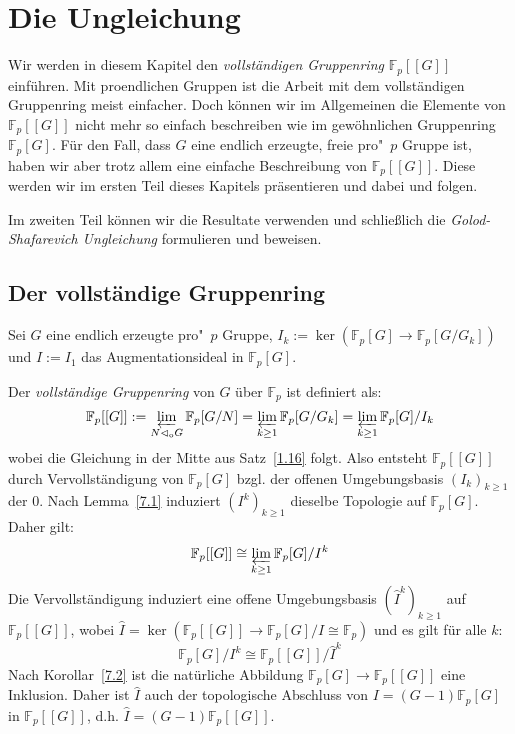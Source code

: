 \documentclass[11pt,a4paper,openany]{memoir}
\begin{document}
\chapter{Die Ungleichung}

Wir werden in diesem Kapitel den \textit{vollständigen Gruppenring} $\mathbb{F}_p[[G]]$ einführen. Mit proendlichen Gruppen ist die Arbeit mit dem vollständigen Gruppenring meist einfacher. Doch können wir im Allgemeinen die Elemente von $\mathbb{F}_p[[G]]$ nicht mehr so einfach beschreiben wie im gewöhnlichen Gruppenring $\mathbb{F}_p[G]$. Für den Fall, dass $G$ eine endlich erzeugte, freie pro"~$p$ Gruppe ist, haben wir aber trotz allem eine einfache Beschreibung von $\mathbb{F}_p[[G]]$. Diese werden wir im ersten Teil dieses Kapitels präsentieren und dabei \cite{Wil98} und \cite{Koc02} folgen.

Im zweiten Teil können wir die Resultate verwenden und schließlich die \textit{Golod-Shafarevich Ungleichung} formulieren und beweisen.

\section{Der vollständige Gruppenring}

Sei $G$ eine endlich erzeugte pro"~$p$ Gruppe,  $I_k:=\ker(\mathbb{F}_p[G]\to\mathbb{F}_p[G/G_k])$ und $I:=I_1$ das Aug\-men\-ta\-tions\-i\-deal in $\mathbb{F}_p[G]$.

\begin{definition}
Der \textit{vollständige Gruppenring} von $G$ über $\mathbb{F}_p$ ist definiert als:
\[\mathbb{F}_p[[G]] := \varprojlim_{N\lhd_\text{o}G}\mathbb{F}_p[G/N] = \varprojlim_{k\geq 1}\mathbb{F}_p[G/G_k] = \varprojlim_{k\geq 1} \mathbb{F}_p[G]/I_k \]
wobei die Gleichung in der Mitte aus Satz~\ref{1.16} folgt. Also entsteht $\mathbb{F}_p[[G]]$ durch Ver\-voll\-stän\-di\-gung von $\mathbb{F}_p[G]$ bzgl. der offenen Umgebungsbasis $(I_k)_{k\geq 1}$ der $0$. Nach Lemma~\ref{7.1} induziert $(I^k)_{k\geq 1}$ dieselbe Topologie auf $\mathbb{F}_p[G]$. Daher gilt:
\[\mathbb{F}_p[[G]]\cong\varprojlim_{k\geq 1} \mathbb{F}_p[G]/I^k \]
Die Vervollständigung induziert eine offene Umgebungsbasis $(\widehat{I}^k)_{k\geq 1}$ auf $\mathbb{F}_p[[G]]$, wobei $\widehat{I}= \ker(\mathbb{F}_p[[G]]\to\mathbb{F}_p[G]/I\cong\mathbb{F}_p)$ und es gilt für alle $k$:
\[\mathbb{F}_p[G]/I^k\cong \mathbb{F}_p[[G]]/\widehat{I}^k \]
Nach Korollar~\ref{7.2} ist die natürliche Abbildung $\mathbb{F}_p[G]\to\mathbb{F}_p[[G]]$ eine Inklusion. Daher ist $\widehat{I}$ auch der topologische Abschluss von $I=(G-1)\mathbb{F}_p[G]$ in $\mathbb{F}_p[[G]]$, d.h. $\widehat{I}=(G-1)\mathbb{F}_p[[G]]$. 
\end{definition}
\end{document}
